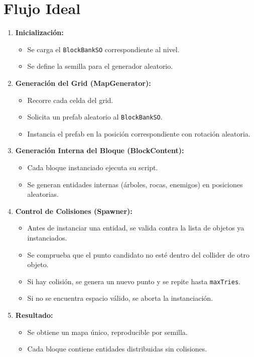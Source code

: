 \documentclass[a4paper,12pt]{article}
\begin{document}
\section{Flujo Ideal}
\begin{enumerate}
    \item \textbf{Inicialización:}
    \begin{itemize}
        \item Se carga el \texttt{BlockBankSO} correspondiente al nivel.
        \item Se define la semilla para el generador aleatorio.
    \end{itemize}

    \item \textbf{Generación del Grid (MapGenerator):}
    \begin{itemize}
        \item Recorre cada celda del grid.
        \item Solicita un prefab aleatorio al \texttt{BlockBankSO}.
        \item Instancia el prefab en la posición correspondiente con rotación aleatoria.
    \end{itemize}

    \item \textbf{Generación Interna del Bloque (BlockContent):}
    \begin{itemize}
        \item Cada bloque instanciado ejecuta su script.
        \item Se generan entidades internas (árboles, rocas, enemigos) en posiciones aleatorias.
    \end{itemize}

    \item \textbf{Control de Colisiones (Spawner):}
    \begin{itemize}
        \item Antes de instanciar una entidad, se valida contra la lista de objetos ya instanciados.
        \item Se comprueba que el punto candidato no esté dentro del collider de otro objeto.
        \item Si hay colisión, se genera un nuevo punto y se repite hasta \texttt{maxTries}.
        \item Si no se encuentra espacio válido, se aborta la instanciación.
    \end{itemize}

    \item \textbf{Resultado:}
    \begin{itemize}
        \item Se obtiene un mapa único, reproducible por semilla.
        \item Cada bloque contiene entidades distribuidas sin colisiones.
    \end{itemize}
\end{enumerate}
\end{document}
